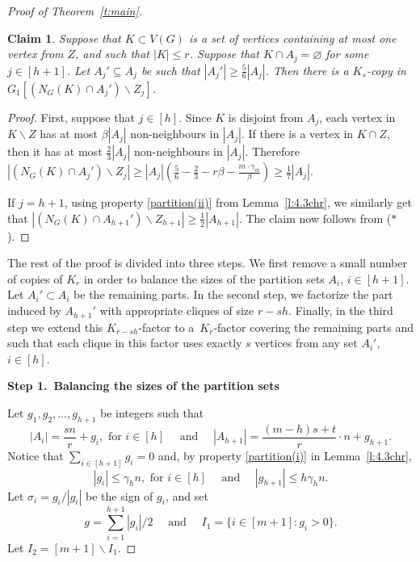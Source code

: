 \documentclass[reqno, 12pt]{amsart}
\numberwithin{equation}{section}
\numberwithin{figure}{section}
\theoremstyle{plain}
\newtheorem{claim}[thm]{Claim}
\theoremstyle{definition}
\let\setminus=\smallsetminus
\let\emptyset=\varnothing
\begin{document}
\begin{proof}[Proof of Theorem~\ref{t:main}]
    \begin{claim}
        \label{c:extend-by-Ks}
        Suppose that $K\subset V(G)$ is a set of vertices containing at most one vertex from $Z$, and such that $|K|\leq r$. Suppose that $K\cap A_j=\emptyset$ for some $j\in [h+1]$. Let $A_j'\subseteq A_j$ be such that $|A_j'|\geq \frac 56 |A_{j}|$. Then there is a $K_s$-copy in $G_1[(N_G(K)\cap A_j')\setminus Z_j]$. 
    \end{claim} 
         
    \begin{proof}
        First, suppose that $j\in [h]$. Since $K$ is disjoint from $A_j$, each vertex in $K\setminus Z$ has at most $\beta|A_j|$ non-neighbours in $|A_j|$. If there is a vertex in $K\cap Z$, then it has at most $\frac 23 |A_j|$ non-neighbours in $|A_j|$. Therefore $|(N_G(K)\cap A_j')\setminus Z_j|\geq |A_j|\left(\frac 56-\frac 23-r\beta-\frac{m\cdot \gamma_m}{\beta}\right)\geq \frac 17 |A_j|$. 
            
        If $j=h+1$, using property \ref{partition(ii)} from Lemma~\ref{l:4.3chr}, we similarly get that $|(N_G(K)\cap A_{h+1}')\setminus Z_{h+1}|\geq \frac 12 |A_{h+1}|$. The claim now follows from ($\ast$).
    \end{proof}

    The rest of the proof is divided into three steps. We first remove a small number of copies of $K_r$ in order to balance the sizes of the partition sets $A_i$, $i\in[h+1]$. Let $A_i' \subset A_i$ be the remaining parts. In the second step, we factorize the part induced by $A_{h+1}'$ with appropriate cliques of size $r-sh$. Finally, in the third step we extend this $K_{r-sh}$-factor to a~$K_r$-factor covering the remaining parts and such that each clique in this factor uses exactly $s$ vertices from any set $A_i'$, $i\in[h]$.

    \smallskip

    {\bf Step 1.~Balancing the sizes of the partition sets}

    \smallskip
        
    Let $g_1, g_2, \ldots, g_{h+1}$ be integers such that 
    \[|A_i|=\frac{sn}{r}+g_i, \text{ for } i\in[h] \quad \text{ and } \quad |A_{h+1}|=\frac{(m-h)s+t}{r}\cdot n+g_{h+1}.\] 
    Notice that $\sum_{i \in [h+1]}g_i = 0$ and, by property \ref{partition(i)} in Lemma~\ref{l:4.3chr}, 
    \begin{equation}\label{eq:g_i-sizes}
        |g_i| \leq \gamma_h n, \text{ for } i\in[h] \quad \text{ and } \quad |g_{h+1}|\leq h\gamma_hn.
    \end{equation}
    Let $\sigma_i=g_i/|g_i|$ be the sign of $g_i$, and set \[g=\sum_{i=1}^{h+1}|g_i|/2 \quad \text{ and } \quad I_1 = \{i\in[m+1]: g_i>0\}.\]
    Let $I_2 = [m+1]\setminus I_1$.


\end{proof}
\end{document}
